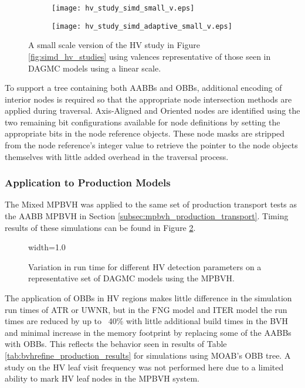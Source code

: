 \begin{figure}[H]
  \begin{subfigure}[b]{0.5\textwidth}
    \texttt{[image: hv\_study\_simd\_small\_v.eps]}
  \end{subfigure}
  \hfill
  \begin{subfigure}[b]{0.5\textwidth}
    \texttt{[image: hv\_study\_simd\_adaptive\_small\_v.eps]}
  \end{subfigure}
  \caption[Small scale study of the HV characterization using the MPBVH.]{A small scale version of the
    HV study in Figure \ref{fig:simd_hv_studies} using valences representative of those
    seen in DAGMC models using a linear scale.}
  \label{fig:simd_hv_studies_small_v}
\end{figure}


To support a tree containing both AABBs and OBBs, additional encoding of
interior nodes is required so that the appropriate node intersection methods are
applied during traversal. Axis-Aligned and Oriented nodes are identified using
the two remaining bit configurations available for node definitions by
setting the appropriate bits in the node reference objects. These node masks are
stripped from the node reference's integer value to retrieve the pointer to the
node objects themselves with little added overhead in the traversal process.

\subsubsection{Application to Production Models}

The Mixed MPBVH was applied to the same set of production transport tests as the
AABB MPBVH in Section \ref{subsec:mpbvh_production_transport}. Timing results of
these simulations can be found in Figure \ref{fig:hv_parameter_study_mpbvh}.

\begin{figure}[H]
  \centering
  {width=1.0\textwidth}
  \caption[High valence detection parameter study using the MPBVH.]{Variation in run time for
    different HV detection parameters on a representative set of DAGMC models
    using the MPBVH.}
  \label{fig:hv_parameter_study_mpbvh}
\end{figure}

The application of OBBs in HV regions makes little difference in the simulation
run times of ATR or UWNR, but in the FNG model and ITER model the run times are
reduced by up to ~40\% with little additional build times in the BVH and
minimal increase in the memory footprint by replacing some of the AABBs with
OBBs. This reflects the behavior seen in results of Table
\ref{tab:bvhrefine_production_results} for simulations using MOAB's OBB tree. A
study on the HV leaf visit frequency was not performed here due to a limited
ability to mark HV leaf nodes in the MPBVH system.

